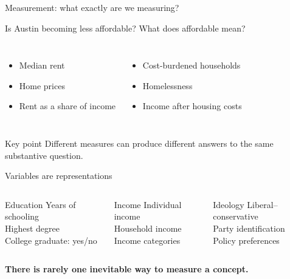 \documentclass[11pt,aspectratio=169]{beamer}
\newcommand{\bigquestion}[1]{%
\begin{center}
\begin{minipage}{0.88\textwidth}
\centering
\Large\color{LBJnavy}\textbf{#1}
\end{minipage}
\end{center}}
\begin{document}
\begin{frame}[standout]
\Large Measurement: what exactly are we measuring?
\end{frame}

\begin{frame}{Is Austin becoming less affordable?}
\pause
\large
What does \alert{affordable} mean?
\pause
\vspace{0.7em}
\begin{columns}[T,onlytextwidth]
\begin{itemize}
  \item Median rent
  \item Home prices
  \item Rent as a share of income
\end{itemize}
\begin{itemize}
  \item Cost-burdened households
  \item Homelessness
  \item Income after housing costs
\end{itemize}
\end{columns}
\vfill \pause
\begin{alertblock}{Key point}
Different measures can produce different answers to the same substantive question.
\end{alertblock}
\end{frame}

\begin{frame}{Variables are representations}
\begin{columns}[T,onlytextwidth]
\begin{block}{Education}
Years of schooling\\[0.3em]
Highest degree\\[0.3em]
College graduate: yes/no
\end{block}
\begin{block}{Income}
Individual income\\[0.3em]
Household income\\[0.3em]
Income categories
\end{block}
\begin{block}{Ideology}
Liberal--conservative\\[0.3em]
Party identification\\[0.3em]
Policy preferences
\end{block}
\end{columns}
\vfill
\bigquestion{There is rarely one inevitable way to measure a concept.}
\end{frame}
\end{document}
